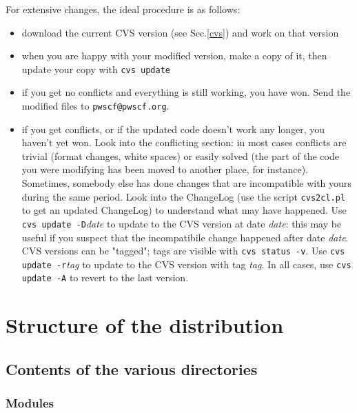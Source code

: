 \documentclass[12pt,a4paper]{article}
\makeatletter
\def\developersmail{\texttt{pwscf@pwscf.org}}
\makeatother
\begin{document}
  For extensive changes, the ideal procedure is as follows:
\begin{itemize}
   \item download the current CVS version (see Sec.\ref{cvs})
    and work on that version
   \item when you are happy with your modified version, make a copy of it,
    then update your copy with \texttt{cvs update}
  \item if you get no conflicts and everything is still working, you have
    won. Send the modified files to \developersmail.
  \item if you get conflicts, or if the updated code doesn't work any
    longer, you haven't yet won. Look into the conflicting section:
    in most cases conflicts are trivial (format changes, white spaces) 
    or easily solved (the part of the code you were modifying has
    been moved to another place, for instance). Sometimes, somebody
    else has done changes that are incompatible with yours during the
    same period. Look into the ChangeLog (use the script \texttt{cvs2cl.pl}
    to get an updated ChangeLog) to understand what may have happened.
    Use \texttt{cvs update -D}{\em date} to update to the CVS version 
    at date {\em date}:
    this may be useful if you suspect that the incompatibile change 
    happened after date {\em date}.
    CVS versions can be "tagged"; tags are visible with 
    \texttt{cvs status -v}. Use \texttt{cvs update -r}{\em tag} 
    to update to the CVS version with tag {\em tag}.
    In all cases, use \texttt{cvs update -A} to revert to the last version.
\end{itemize}

\section{Structure of the distribution}

\subsection{Contents of the various directories}

\subsubsection{Modules}
\end{document}
